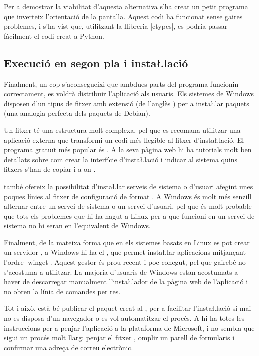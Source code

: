 Per a demostrar la viabilitat d'aquesta alternativa s'ha creat un petit
programa que inverteix l'orientació de la pantalla. Aquest codi ha funcionat
sense gaires problemes, i s'ha vist que, utilitzant la llibreria \ord|ctypes|,
es podria passar fàcilment el codi creat a Python.

\subsection{Execució en segon pla i insta\l.lació}

Finalment, un cop s'aconsegueixi que ambdues parts del programa funcionin
correctament, es voldrà distribuir l'aplicació als usuaris. Els sistemes de
Windows disposen d'un tipus de fitxer amb extensió  (de l'anglès
) per a insta\l.lar paquets (una analogia perfecta dels
paquets de Debian).

Un fitxer  té una estructura molt complexa, pel que es recomana
utilitzar una aplicació externa que transformi un codi més llegible al fitxer
d'insta\l.lació. El programa gratuït més popular és . A la seva pàgina
web hi ha tutorials molt ben detallats sobre com crear la interfície
d'insta\l.lació i indicar al sistema quins fitxers s'han de copiar i a on
\cite{Wix}.

 també ofereix la possibilitat d'insta\l.lar serveis de sistema o
d'usuari afegint unes poques línies al fitxer de configuració de format
. A Windows és molt més senzill alternar entre un servei de sistema
o un servei d'usuari, pel que és molt probable que tots els problemes que hi ha
hagut a Linux per a que funcioni  en un servei de sistema no hi
seran en l'equivalent de Windows.

Finalment, de la mateixa forma que en els sistemes basats en Linux es pot crear
un servidor , a Windows hi ha el , que
permet insta\l.lar aplicacions mitjançant l'ordre \ord|winget|. Aquest gestor
és prou recent i poc conegut, pel que gairebé no s'acostuma a utilitzar. La
majoria d'usuaris de Windows estan acostumats a haver de descarregar manualment
l'insta\l.lador de la pàgina web de l'aplicació i no obren la línia de
comandes per res.

Tot i això, està bé publicar el paquet creat al ,
per a facilitar l'insta\l.lació si mai no es disposa d'un navegador o es vol
automatitzar el procés. A \cite{WPM} hi ha totes les instruccions per a
penjar l'aplicació a la plataforma de Microsoft, i no sembla que sigui un
procés molt llarg: penjar el fitxer , omplir un parell de formularis
i confirmar una adreça de correu electrònic.

